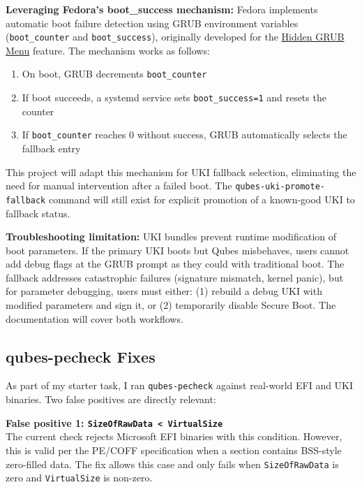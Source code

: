 \documentclass[12pt, a4paper]{article}
\begin{document}
\textbf{Leveraging Fedora's boot\_success mechanism:} Fedora implements automatic boot failure detection using GRUB environment variables (\texttt{boot\_counter} and \texttt{boot\_success}), originally developed for the \href{https://fedoraproject.org/wiki/Changes/HiddenGrubMenu}{Hidden GRUB Menu} feature. The mechanism works as follows:

\begin{enumerate}
    \item On boot, GRUB decrements \texttt{boot\_counter}
    \item If boot succeeds, a systemd service sets \texttt{boot\_success=1} and resets the counter
    \item If \texttt{boot\_counter} reaches 0 without success, GRUB automatically selects the fallback entry
\end{enumerate}

This project will adapt this mechanism for UKI fallback selection, eliminating the need for manual intervention after a failed boot. The \texttt{qubes-uki-promote-fallback} command will still exist for explicit promotion of a known-good UKI to fallback status.

\textbf{Troubleshooting limitation:} UKI bundles prevent runtime modification of boot parameters. If the primary UKI boots but Qubes misbehaves, users cannot add debug flags at the GRUB prompt as they could with traditional boot. The fallback addresses catastrophic failures (signature mismatch, kernel panic), but for parameter debugging, users must either: (1) rebuild a debug UKI with modified parameters and sign it, or (2) temporarily disable Secure Boot. The documentation will cover both workflows.

\subsection{qubes-pecheck Fixes}

As part of my starter task, I ran \texttt{qubes-pecheck} against real-world EFI and UKI binaries. Two false positives are directly relevant:

\textbf{False positive 1: \texttt{SizeOfRawData < VirtualSize}}\\
The current check rejects Microsoft EFI binaries with this condition. However, this is valid per the PE/COFF specification when a section contains BSS-style zero-filled data. The fix allows this case and only fails when \texttt{SizeOfRawData} is zero and \texttt{VirtualSize} is non-zero.
\end{document}
